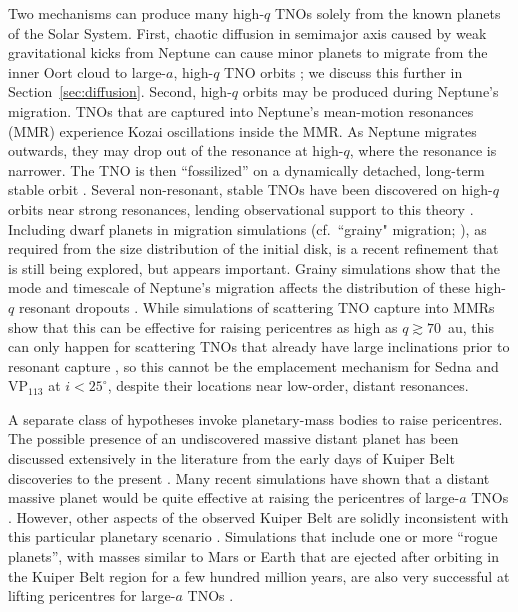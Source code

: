\documentclass[preprint]{aastex62}
\begin{document}
Two mechanisms can produce many high-$q$ TNOs solely from the known planets of the Solar System.
First, chaotic diffusion in semimajor axis caused by weak gravitational kicks from Neptune can cause minor planets to migrate from the inner Oort cloud to large-$a$, high-$q$ TNO orbits \citep{Duncan1987, Kaib:2009, bannister17}; we discuss this further in Section~\ref{sec:diffusion}.
Second, high-$q$ orbits may be produced during Neptune's migration. 
TNOs that are captured into Neptune's mean-motion resonances (MMR) experience Kozai oscillations inside the MMR. 
As Neptune migrates outwards, they may drop out of the resonance at high-$q$, where the resonance is narrower. 
The TNO is then ``fossilized'' on a dynamically detached, long-term stable orbit \citep{gomes03}.
Several non-resonant, stable TNOs have been discovered on high-$q$ orbits near strong resonances, lending observational support to this theory \citep{pike15,lawler18res}.
Including dwarf planets in migration simulations (cf.\ ``grainy" migration; \citealt{nesvorny16}), as required from the size distribution of the initial disk, is a recent refinement that is still being explored, but appears important.
Grainy simulations show that the mode and timescale of Neptune's migration affects the distribution of these high-$q$ resonant dropouts \citep{Nesvornyetal2016,kaib16}.
While simulations of scattering TNO capture into MMRs show that this can be effective for raising pericentres as high as $q\gtrsim70$~au, this can only happen for scattering TNOs that already have large inclinations prior to resonant capture \citep{gallardo12}, so this cannot be the emplacement mechanism for Sedna and VP$_{113}$ at $i<25^{\circ}$, despite their locations near low-order, distant resonances.  

A separate class of hypotheses invoke planetary-mass bodies to raise pericentres.
The possible presence of an undiscovered massive distant planet has been discussed extensively in the literature from the early days of Kuiper Belt discoveries to the present \citep{gladman02,brownetal04,Gladman:2005,LykawkaMukai2008,soaresgomes13,trujillosheppard14}.
Many recent simulations have shown that a distant massive planet would be quite effective at raising the pericentres of large-$a$ TNOs \citep[][see Figure~\ref{fig:rogue}]{batyginbrown16,shankman17,lawler2017,Lietal2018}.
However, other aspects of the observed Kuiper Belt are solidly inconsistent with this particular planetary scenario \citep{lawler2017,shankman17,shankman17bias,nesvorny17}. 
Simulations that include one or more ``rogue planets'', with masses similar to Mars or Earth that are ejected after orbiting in the Kuiper Belt region for a few hundred million years, are also very successful at lifting pericentres for large-$a$ TNOs \citep{gladmanchan06,silsbee18}.
\end{document}
